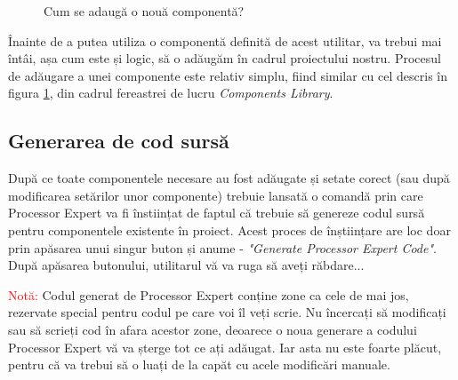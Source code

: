 \begin{figure}
    \vspace{-30pt}
    \vspace{-20pt}
    \caption{\label{fig:CodeWarrior-ProcessorExpertAdd} Cum se adaugă o nouă componentă?}
    \vspace{-10pt}
\end{figure}

Înainte de a putea utiliza o componentă definită de acest utilitar, va trebui mai întâi, așa cum este și logic, să o adăugăm în cadrul proiectului nostru. Procesul de adăugare a unei componente este relativ simplu, fiind similar cu cel descris în figura \ref{fig:CodeWarrior-ProcessorExpertAdd}, din cadrul fereastrei de lucru \textit{Components Library}.

\subsection{Generarea de cod sursă}

După ce toate componentele necesare au fost adăugate și setate corect (sau după modificarea setărilor unor componente) trebuie lansată o comandă prin care Processor Expert va fi înstiințat de faptul că trebuie să genereze codul sursă pentru componentele existente în proiect. Acest proces de înștiințare are loc doar prin apăsarea unui singur buton și anume - \textit{"Generate Processor Expert Code"}. După apăsarea butonului, utilitarul vă va ruga să aveți răbdare...

\textcolor{red}{Notă:} Codul generat de Processor Expert conține zone ca cele de mai jos, rezervate special pentru codul pe care voi îl veți scrie. Nu încercați să modificați sau să scrieți cod în afara acestor zone, deoarece o noua generare a codului Processor Expert vă va șterge tot ce ați adăugat. Iar asta nu este foarte plăcut, pentru că va trebui să o luați de la capăt cu acele modificări manuale.

